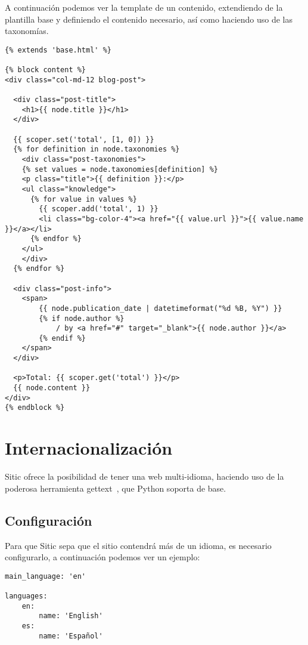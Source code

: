 A continuación podemos ver la template de un contenido, extendiendo de la plantilla base y definiendo
el contenido necesario, así como haciendo uso de las taxonomías.

\begin{verbatim}
{% extends 'base.html' %}

{% block content %}
<div class="col-md-12 blog-post">

  <div class="post-title">
    <h1>{{ node.title }}</h1>
  </div>

  {{ scoper.set('total', [1, 0]) }}
  {% for definition in node.taxonomies %}
    <div class="post-taxonomies">
    {% set values = node.taxonomies[definition] %}
    <p class="title">{{ definition }}:</p>
    <ul class="knowledge">
      {% for value in values %}
        {{ scoper.add('total', 1) }}
        <li class="bg-color-4"><a href="{{ value.url }}">{{ value.name }}</a></li>
      {% endfor %}
    </ul>
    </div>
  {% endfor %}

  <div class="post-info">
    <span>
        {{ node.publication_date | datetimeformat("%d %B, %Y") }}
        {% if node.author %}
            / by <a href="#" target="_blank">{{ node.author }}</a>
        {% endif %}
    </span>
  </div>

  <p>Total: {{ scoper.get('total') }}</p>
  {{ node.content }}
</div>
{% endblock %}
\end{verbatim}


\section{Internacionalización}

Sitic ofrece la posibilidad de tener una web multi-idioma, haciendo uso de la poderosa herramienta
gettext~\cite{gettext}, que Python soporta de base.

\subsection{Configuración}

Para que Sitic sepa que el sitio contendrá más de un idioma, es necesario configurarlo, a continuación
podemos ver un ejemplo:

\begin{verbatim}
main_language: 'en'

languages:
    en:
        name: 'English'
    es:
        name: 'Español'
\end{verbatim}

